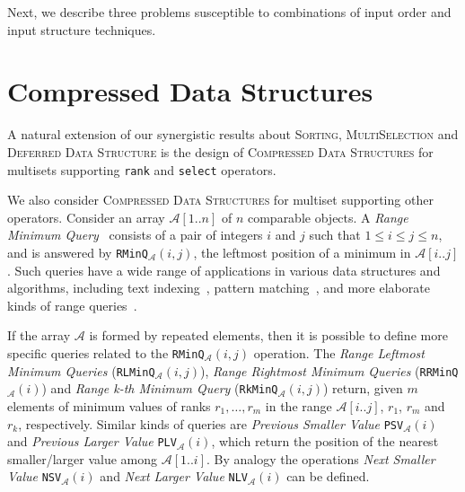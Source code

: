 Next, we describe three problems susceptible to combinations of input
order and input structure techniques.

\section{Compressed Data Structures}
\label{sec:compressed}

A natural extension of our synergistic results about \textsc{Sorting},
\textsc{MultiSelection} and \textsc{Deferred Data Structure} is the
design of \textsc{Compressed Data Structures} for multisets supporting
\texttt{rank} and \texttt{select} operators.

We also consider \textsc{Compressed Data Structures} for multiset
supporting other operators. Consider an array ${\mathcal{A}}[1..n]$ of
$n$ comparable objects. A \emph{Range Minimum
  Query}~\cite{1993-SICOMP-RecursiveStarTreeParallelDataStructure-BerkmanVishkin}
consists of a pair of integers $i$ and $j$ such that
$1\le i\le j\le n$, and is answered by
\texttt{RMinQ}$_{\mathcal{A}}(i,j)$, the leftmost position of a
minimum in $\mathcal{A}[i..j]$. Such queries have a wide range of
applications in various data structures and algorithms, including text
indexing~\cite{2009-TCS-FasterEntropyBoundedCompressedSuffixTrees-FischerMakinenNavarro},
pattern
matching~\cite{2008-STACS-ImprovedAlgorithmsForTheRangeNextValueProblemAndApplications-CrochemoreIliopoulosKubicaRahmanWalen},
and more elaborate kinds of range
queries~\cite{2004-ISAAC-OnTheRangeMaximumSumSegmentQueryProblem-ChenChao}.


If the array $\mathcal{A}$ is formed by repeated elements, then it is possible
to define more specific queries related to the
\texttt{RMinQ}$_{\mathcal{A}}(i,j)$ operation. The \emph{Range
  Leftmost Minimum Queries} (\texttt{RLMinQ}$_{\mathcal{A}}(i,j)$),
\emph{Range Rightmost Minimum Queries}
(\texttt{RRMinQ}$_{\mathcal{A}}(i)$) and \emph{Range k-th Minimum
  Query} (\texttt{RkMinQ}$_{\mathcal{A}}(i,j)$) return, given $m$
elements of minimum values of ranks $r_1, \dots, r_m$ in the range
${\mathcal{A}}[i..j]$, $r_1$, $r_m$ and $r_k$, respectively.
Similar kinds of queries are \emph{Previous Smaller Value}
\texttt{PSV}$_{\mathcal{A}}(i)$ and \emph{Previous Larger Value}
\texttt{PLV}$_{\mathcal{A}}(i)$, which return the position of the nearest
smaller/larger value among ${\mathcal{A}}[1..i]$. By analogy the operations
\emph{Next Smaller Value} \texttt{NSV}$_{\mathcal{A}}(i)$ and \emph{Next Larger Value}
\texttt{NLV}$_{\mathcal{A}}(i)$ can be defined.

